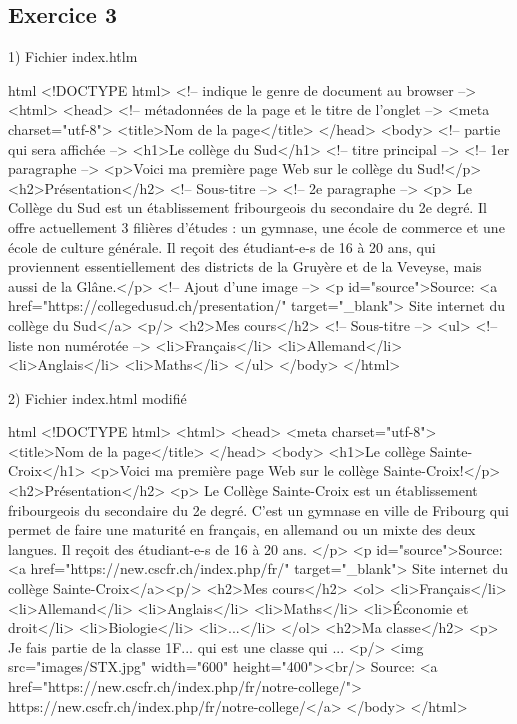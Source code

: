 \documentclass[a4paper,11pt]{article}
\begin{document}
\subsection{Exercice 3}
1) Fichier index.htlm
\begin{code}{html}
<!DOCTYPE html> <!-- indique le genre de document au browser -->
<html>
  <head> <!-- métadonnées de la page et le titre de l'onglet -->
    <meta charset="utf-8">
    <title>Nom de la page</title>
  </head>
  <body> <!-- partie qui sera affichée -->
    <h1>Le collège du Sud</h1> <!-- titre principal -->
    <!-- 1er paragraphe -->
    <p>Voici ma première page Web sur le collège du Sud!</p>
    <h2>Présentation</h2> <!-- Sous-titre -->
    <!-- 2e paragraphe -->
    <p>
    Le Collège du Sud est un établissement fribourgeois du
    secondaire du 2e degré. Il offre actuellement 3 filières
    d’études : un gymnase, une école de commerce et une école
    de culture générale. Il reçoit des étudiant-e-s de 16 à 20 ans,
    qui proviennent essentiellement des districts de la Gruyère
    et de la Veveyse, mais aussi de la Glâne.</p>
    <!-- Ajout d'une image -->
    <p id="source">Source:
    <a href="https://collegedusud.ch/presentation/" target="_blank">
    Site internet du collège du Sud</a>
    <p/>
    <h2>Mes cours</h2> <!-- Sous-titre -->
    <ul> <!-- liste non numérotée -->
      <li>Français</li>
      <li>Allemand</li>
      <li>Anglais</li>
      <li>Maths</li>
    </ul>
  </body>
</html>
\end{code}
2) Fichier index.html modifié
\begin{code}{html}
<!DOCTYPE html>
<html>
  <head>
    <meta charset="utf-8">
    <title>Nom de la page</title>
  </head>
  <body>
    <h1>Le collège Sainte-Croix</h1>
    <p>Voici ma première page Web sur le collège Sainte-Croix!</p>
    <h2>Présentation</h2>
    <p>
    Le Collège Sainte-Croix est un établissement fribourgeois
    du secondaire du 2e degré. C'est un gymnase en ville de Fribourg
    qui permet de faire une maturité en français, en allemand ou un
    mixte des deux langues. Il reçoit des étudiant-e-s de 16 à 20 ans.
    </p>
    <p id="source">Source:
    <a href="https://new.cscfr.ch/index.php/fr/" target="_blank">
    Site internet du collège Sainte-Croix</a><p/>
    <h2>Mes cours</h2>
    <ol>
      <li>Français</li>
      <li>Allemand</li>
      <li>Anglais</li>
      <li>Maths</li>
      <li>Économie et droit</li>
      <li>Biologie</li>
      <li>...</li>
    </ol>
    <h2>Ma classe</h2>
    <p>
    Je fais partie de la classe 1F... qui est une classe qui ...
    <p/>
    <img src="images/STX.jpg" width="600" height="400"><br/>
    Source:
    <a href="https://new.cscfr.ch/index.php/fr/notre-college/">
    https://new.cscfr.ch/index.php/fr/notre-college/</a>
  </body>
</html>
\end{code}
\end{document}

